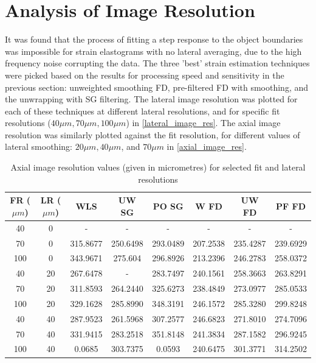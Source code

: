 \section{Analysis of Image Resolution} \label{image_res_results}
It was found that the process of fitting a step response to the object boundaries was impossible for strain elastograms with no lateral averaging, due to the high frequency noise corrupting the data. The three 'best' strain estimation techniques were picked based on the results for processing speed and sensitivity in the previous section: unweighted smoothing FD, pre-filtered FD with smoothing, and the unwrapping with SG filtering. The lateral image resolution was plotted for each of these techniques at different lateral resolutions, and for specific fit resolutions ($40\mu m, 70 \mu m, 100\mu m$) in \autoref{lateral_image_res}. The axial image resolution was similarly plotted against the fit resolution, for different values of lateral smoothing: $20\mu m, 40\mu m$, and $70\mu m$ in \autoref{axial_image_res}.

\begin{table}[h]
	\begin{center}
		\begin{tabular}{|c||c||c|c|c|c|c|c|}
			\hline 
			FR ($\mu m$) & LR ($\mu m$) & WLS & UW SG & PO SG & W FD & UW FD & PF FD \\
			\hline
			\hline
			40 & 0 & - & - & - & - & - & - \\
			\hline
			70 & 0 & 315.8677 & 250.6498 & 293.0489 & 207.2538 & 235.4287 & 239.6929 \\
			\hline
			100 & 0 & 343.9671 & 275.604 & 296.8926 & 213.2396 & 246.2783 & 258.0372 \\
			\hline
			40 & 20 & 267.6478 & - & 283.7497 & 240.1561 & 258.3663 & 263.8291 \\
			\hline
			70 & 20 & 311.8593 & 264.2440 & 325.6273 & 238.4849 & 273.0977 & 285.0533 \\
			\hline
			100 & 20 &  329.1628 & 285.8990 & 348.3191 & 246.1572 & 285.3280 & 299.8248 \\
			\hline
			40 & 40 & 287.9523 & 261.5968 & 307.2577 &  246.6823 & 271.8010 & 274.7096 \\
			\hline
			70 & 40 & 331.9415 & 283.2518 & 351.8148 & 241.3834 & 287.1582 & 296.9245 \\
			\hline
			100 & 40 & 0.0685 & 303.7375 & 0.0593 &  240.6475 & 301.3771 & 314.2502 \\
			\hline
		\end{tabular}
	\end{center}
	\caption{Axial image resolution values (given in micrometres) for selected fit and lateral resolutions}
	\label{axial_imageres_table}
\end{table}

